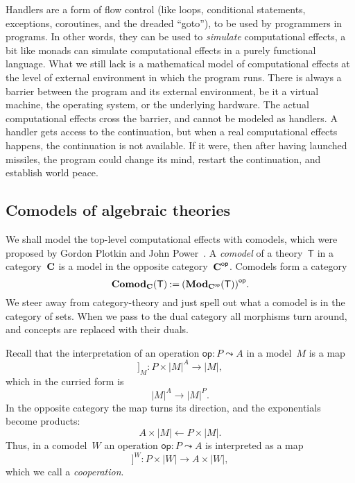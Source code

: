 \documentclass{amsart}
\newcommand{\theory}[1]{\mathsf{#1}} %
\newcommand{\ModC}[2]{\text{\textbf{Mod}}_{#1}(\theory{#2})} %
\newcommand{\ComodC}[2]{\text{\textbf{Comod}}_{#1}(\theory{#2})} %
\newcommand{\category}[1]{\text{\textbf{#1}}} %
\newcommand{\opcat}[1]{{#1}^{\mathsf{op}}} %
\newcommand{\opdecl}[3]{#1 : #2 \leadsto #3} %
\newcommand{\sem}[1]{[\![#1]\!]} %
\newcommand{\defeq}{\mathbin{{:}{=}}} %
\newcommand{\kode}[1]{\mathsf{#1}}
\begin{document}
Handlers are a form of flow control (like loops, conditional statements,
exceptions, coroutines, and the dreaded ``goto''), to be used by programmers in
programs. In other words, they can be used to \emph{simulate} computational
effects, a bit like monads can simulate computational effects in a purely
functional language. What we still lack is a mathematical model of computational
effects at the level of external environment in which the program runs. There is
always a barrier between the program and its external environment, be it a
virtual machine, the operating system, or the underlying hardware. The actual
computational effects cross the barrier, and cannot be modeled as handlers. A
handler gets access to the continuation, but when a real computational effects
happens, the continuation is not available. If it were, then after having
launched missiles, the program could change its mind, restart the continuation,
and establish world peace.

\subsection{Comodels of algebraic theories}
\label{sec:comod-algebr-theor}

We shall model the top-level computational effects with comodels, which were
proposed by Gordon Plotkin and John
Power~\cite{plotkin08:_tensor_comod_model_operat_seman}. A \emph{comodel} of a
theory~$\theory{T}$ in a category~$\category{C}$ is a model in the opposite
category~$\opcat{\category{C}}$. Comodels form a category
%
\begin{equation*}
  \ComodC{\category{C}}{T} \defeq \opcat{(\ModC{\opcat{\category{C}}}{T})}.
\end{equation*}
%
We steer away from category-theory and just spell out what a comodel is in the
category of sets. When we pass to the dual category all morphisms turn around,
and concepts are replaced with their duals.

Recall that the interpretation of an operation $\opdecl{\kode{op}}{P}{A}$ in a
model~$M$ is a map
%
\begin{equation*}
  \sem{\kode{op}}_M :
  P \times |M|^A \longrightarrow |M|,
\end{equation*}
%
which in the curried form is
%
\begin{equation*}
  |M|^A \longrightarrow |M|^P.
\end{equation*}
%
In the opposite category the map turns its direction, and the exponentials
become products:
%
\begin{equation*}
  A \times |M| \longleftarrow P \times |M|.
\end{equation*}
%
Thus, in a comodel~$W$ an operation $\opdecl{\kode{op}}{P}{A}$ is interpreted as a map
%
\begin{equation*}
  \sem{\kode{op}}^W : P \times |W| \to A \times |W|,
\end{equation*}
%
which we call a \emph{cooperation}.
\end{document}
